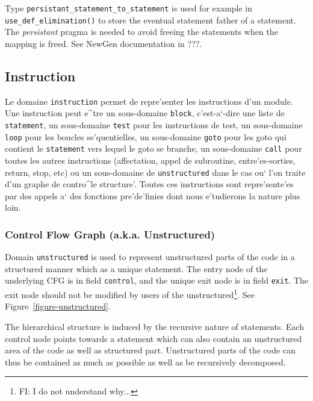 {Type {\tt persistant\_statement\_to\_statement} is used for example in
\verb/use_def_elimination()/ to store the eventual statement father of a
statement. The {\em persistant} pragma is needed to avoid freeing the
statements when the mapping is freed. See NewGen documentation in ???.

\subsection{Instruction}
\label{subsection-instruction}


{ 
Le domaine \verb/instruction/ permet de repre'senter les instructions
d'un module. Une instruction peut e^tre un sous-domaine \verb/block/,
c'est-a`-dire une liste de \verb/statement/, un sous-domaine \verb/test/
pour les instructions de test, un sous-domaine \verb/loop/ pour les
boucles se'quentielles, un sous-domaine \verb/goto/ pour les goto qui
contient le
\verb/statement/ vers lequel le goto se branche, un sous-domaine
\verb/call/ pour toutes les autres instructions (affectation, appel de
subroutine, entre'es-sorties, return, stop, etc) ou un sous-domaine de
\verb/unstructured/ dans le cas ou` l'on traite d'un graphe de contro^le
structure'. Toutes ces instructions 
sont repre'sente'es par des appels a` des fonctions pre'de'finies dont
nous e'tudierons la nature plus loin.
}

\subsubsection{Control Flow Graph (a.k.a. Unstructured)}
\label{subsubsection-unstructured}

{

Domain \verb/unstructured/ is used to represent unstructured parts of
the code in a structured manner which as a unique statement. The entry
node of the underlying CFG is in field \verb/control/, and the
unique exit node is in field \verb/exit/. The exit node should not be
modified by users of the unstructured\footnote{FI: I do not understand
why...}.  See Figure~\ref{figure-unstructured}.

The hierarchical structure is induced by the recursive nature of
statements.  Each control node points towards a statement which can also
contain an unstructured area of the code as well as structured
part. Unstructured parts of the code can thus be contained as much as
possible as well as be recursively decomposed.

}}
